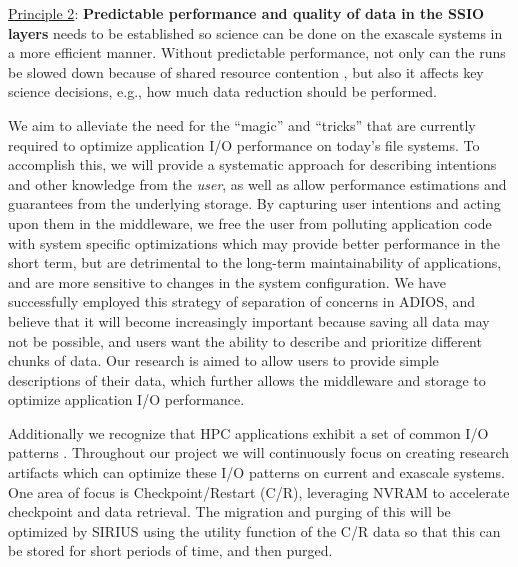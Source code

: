 \underline{Principle 2}: {\bf Predictable performance and quality of data in the SSIO layers} needs to be
established so science can be done on the exascale systems in a more efficient manner. Without
predictable performance, not only can the runs be slowed down because of
shared resource contention \cite{liu_hotstorage,lofstead2010managing}, 
but also it affects key science decisions, e.g., how much data reduction should be performed.

We aim to alleviate the need for the ``magic'' and ``tricks''
that are currently required to optimize application I/O performance
on today's file systems. To accomplish this, we will provide a systematic
approach for describing intentions and other knowledge from the {\it user}, 
as well as allow performance estimations and guarantees 
from the underlying storage.
By capturing user intentions and acting upon them in the middleware, we
free the user from polluting application code with system specific
optimizations which may provide better performance in the short term,
but are detrimental to the long-term maintainability of applications, and
are more sensitive to changes in the system configuration. We have successfully
employed this strategy of separation of concerns in ADIOS, and believe that
it will become increasingly important because saving all data may not be possible, and
users want the ability to describe and prioritize different chunks of data. 
Our research is aimed to allow users to provide simple descriptions of their data,
which further allows the middleware and storage to optimize application I/O performance.

Additionally we recognize that HPC applications exhibit a set
of common I/O patterns \cite{lofstead2011six,polte2009and,tian2011edo,tian2012system}.
Throughout our project we will continuously focus on creating research artifacts 
which can optimize these I/O patterns on current and
exascale systems. One area of focus is Checkpoint/Restart (C/R), leveraging NVRAM to accelerate
checkpoint and data retrieval. 
The migration and purging of this will be optimized by SIRIUS using the utility function of 
the C/R data so that this can be stored for short periods of time, and then purged. 



